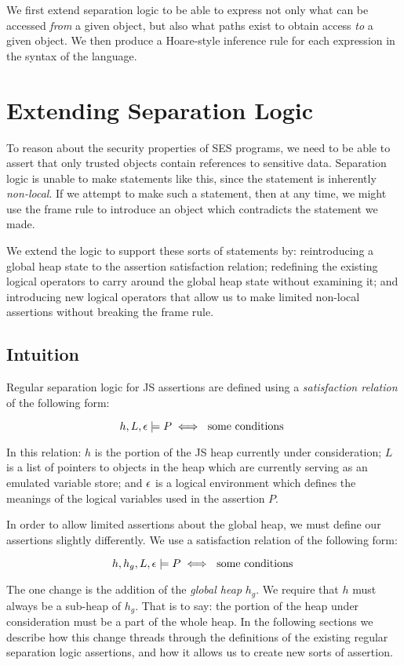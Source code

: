 \documentclass[a4paper,notitlepage]{report}
\begin{document}
We first extend separation logic to be able to express not only what can be
accessed \emph{from} a given object, but also what paths exist to obtain access
\emph{to} a given object. We then produce a Hoare-style inference rule for each
expression in the syntax of the language.

\section{Extending Separation Logic}
\label{sec:extendingseplog}
To reason about the security properties of SES programs, we need to be able to
assert that only trusted objects contain references to sensitive data.
Separation logic is unable to make statements like this, since the
statement is inherently \emph{non-local}. If we attempt to make such a
statement, then at any time, we might use the frame rule to introduce an object
which contradicts the statement we made.

We extend the logic to support these sorts of statements by: reintroducing a global heap state to the
assertion satisfaction relation; redefining the existing logical operators to
carry around the global heap state without examining it; and introducing new
logical operators that allow us to make limited non-local assertions without
breaking the frame rule.

\subsection{Intuition}
\label{sec:extendingseplog:intuition}

Regular separation logic for JS assertions are defined using a
\emph{satisfaction relation} of the following form:

\[
h,L,\epsilon \models P \iff \text{ some conditions }
\]

In this relation: $h$ is the portion of the JS heap currently under
consideration; $L$ is a list of pointers to objects in the heap which are
currently serving as an emulated variable store; and $\epsilon$ is a logical
environment which defines the meanings of the logical variables used in the
assertion $P$.

In order to allow limited assertions about the global heap, we must define our
assertions slightly differently. We use a satisfaction relation of the following
form:

\[
h,h_g,L,\epsilon \models P \iff \text{ some conditions }
\]

The one change is the addition of the \emph{global heap} $h_g$. We require that
$h$ must always be a sub-heap of $h_g$. That is to say: the portion of the heap
under consideration must be a part of the whole heap. In the following sections
we describe how this change threads through the definitions of the existing
regular separation logic assertions, and how it allows us to create new sorts of
assertion.
\end{document}
